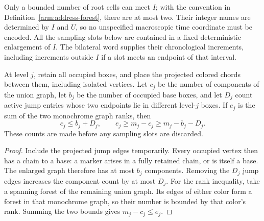 Only a bounded number of root cells can meet $I$; with the convention in
Definition~\ref{arm:address-forest}, there are at most two.  Their integer
names are determined by $I$ and $U$, so no unspecified macroscopic time
coordinate must be encoded.  All the sampling slots below are contained
in a fixed deterministic enlargement of $I$.  The bilateral word supplies
their chronological increments, including increments outside $I$ if a
slot meets an endpoint of that interval.

\begin{lemma}\label{arm:projected-rank}
At level $j$, retain all occupied boxes, and place the projected colored
chords between them, including isolated vertices.  Let $c_j$ be the
number of components of the union graph, let $b_j$ be the number of
occupied base boxes, and let $D_j$ count active jump entries whose two
endpoints lie in different level-$j$ boxes.  If $e_j$ is the sum of the
two monochrome graph ranks, then
\begin{equation}\label{arm:rank-component-bound}
 c_j\leq b_j+D_j,
 \qquad e_j\geq m_j-c_j\geq m_j-b_j-D_j.
\end{equation}
These counts are made before any sampling slots are discarded.
\end{lemma}
\begin{proof}
Include the projected jump edges temporarily.  Every occupied vertex
then has a chain to a base: a marker arises in a fully retained chain,
or is itself a base.  The enlarged graph therefore has at most $b_j$
components.  Removing the $D_j$ jump edges increases the component count
by at most $D_j$.  For the rank inequality, take a spanning forest of the
remaining union graph.  Its edges of either color form a forest in that
monochrome graph, so their number is bounded by that color's rank.
Summing the two bounds gives $m_j-c_j\leq e_j$.
\end{proof}

